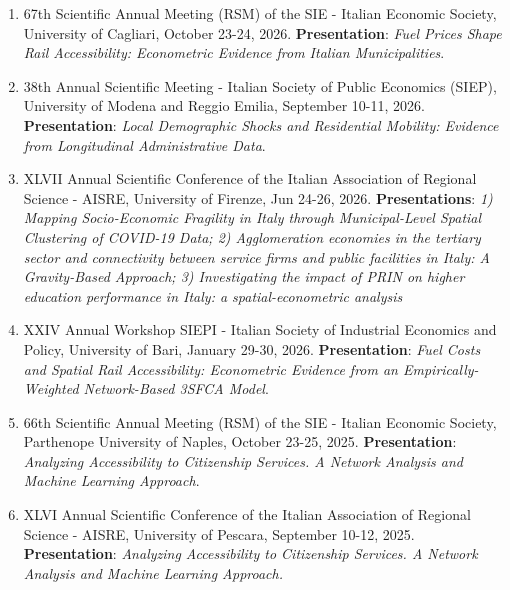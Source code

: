 \documentclass[11pt,a4paper,sans]{moderncv} %
\begin{document}
\begin{enumerate}[label=\arabic*.]


    
    \item 67th Scientific Annual Meeting (RSM) of the SIE - Italian Economic Society, University of Cagliari, October 23-24, 2026. \textbf{Presentation}: \textit{Fuel Prices Shape Rail Accessibility: Econometric Evidence from Italian Municipalities}.


    \item 38th Annual Scientific Meeting - Italian Society of Public Economics (SIEP), University of Modena and Reggio Emilia, September  10-11, 2026. \textbf{Presentation}: \textit{Local Demographic Shocks and Residential Mobility: Evidence from Longitudinal Administrative Data}.
        

    \item XLVII Annual Scientific Conference of the Italian Association of Regional Science - AISRE, University of Firenze, Jun 24-26, 2026. \textbf{Presentations}: \textit{1) Mapping Socio-Economic Fragility in Italy through Municipal-Level Spatial Clustering of COVID-19 Data; 2) Agglomeration economies in the tertiary sector and connectivity between service firms and public facilities in Italy: A Gravity-Based Approach; 3) Investigating the impact of PRIN on higher education performance in Italy: a spatial-econometric analysis
    }

    \item XXIV Annual Workshop SIEPI - Italian Society of Industrial Economics and Policy, University of Bari, January 29-30, 2026. \textbf{Presentation}: \textit{Fuel Costs and Spatial Rail Accessibility: Econometric Evidence from an Empirically-Weighted Network-Based 3SFCA Model}.
        

    
    \item 66th Scientific Annual Meeting (RSM) of the SIE - Italian Economic Society, Parthenope University of Naples, October 23-25, 2025. \textbf{Presentation}: \textit{Analyzing Accessibility to Citizenship Services. A Network Analysis and Machine Learning Approach}.
        
        

    \item XLVI Annual Scientific Conference of the Italian Association of Regional Science - AISRE, University of Pescara, September 10-12, 2025. \textbf{Presentation}: \textit{Analyzing Accessibility to Citizenship Services. A Network Analysis and Machine Learning Approach.
    }
    

\end{enumerate}
\end{document}
